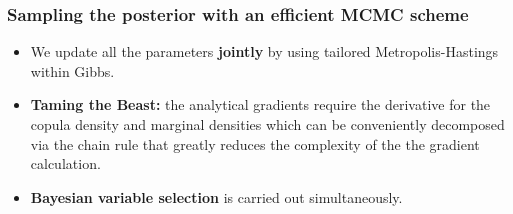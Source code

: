 \documentclass[10pt]{beamer}
\begin{document}
\begin{frame}[allowframebreaks]
  \frametitle{Sampling the posterior with an efficient MCMC scheme}
  \begin{itemize}
  \item We update all the parameters \textbf{jointly} by using tailored
    Metropolis-Hastings within Gibbs.

  \item \textbf{Taming the Beast:} the analytical gradients require the derivative for the
    copula density and marginal densities which can be conveniently decomposed via the
    chain rule that greatly reduces the complexity of the the gradient calculation.


  \item \textbf{Bayesian variable selection} is carried out simultaneously.





\end{itemize}
\end{frame}
\end{document}
